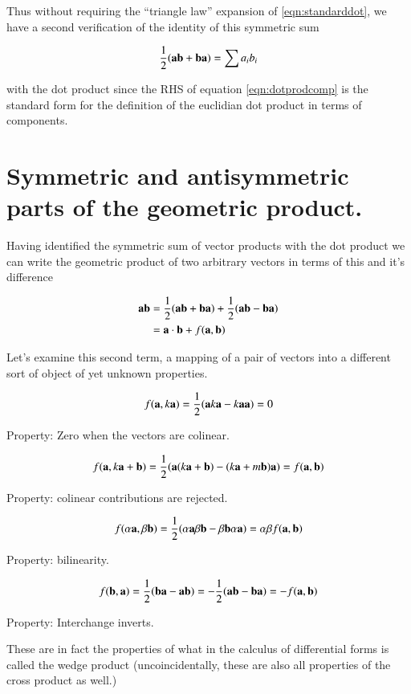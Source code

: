 \documentclass{article}      %
\begin{document}
Thus without requiring the ``triangle law'' expansion of \ref{eqn:standarddot}, we have a second
verification of the identity of this symmetric sum

\begin{equation}\label{eqn:dotprodcomp}
\frac{1}{2}(\mathbf{a}\mathbf{b} + \mathbf{b}\mathbf{a}) = \sum{a_i b_i}
\end{equation}

with the dot product since the RHS of equation \ref{eqn:dotprodcomp} is the standard form for the definition of the euclidian dot product in terms
of components.

\section{ Symmetric and antisymmetric parts of the geometric product. }

Having identified the symmetric sum of vector products with the dot product we can write the geometric product of two arbitrary vectors
in terms of this and it's difference

\begin{align*}
\mathbf{a} \mathbf{b} 
&= \frac{1}{2}(\mathbf{a} \mathbf{b} + \mathbf{b} \mathbf{a}) + \frac{1}{2}(\mathbf{a} \mathbf{b} - \mathbf{b} \mathbf{a}) \\
&= \mathbf{a} \cdot \mathbf{b} + f(\mathbf{a}, \mathbf{b}) \\
\end{align*}

Let's examine this second term, a mapping of a pair of vectors into a different sort of object of yet unknown properties.

\[
f(\mathbf{a}, k\mathbf{a}) = \frac{1}{2}(\mathbf{a} k\mathbf{a} - k\mathbf{a} \mathbf{a}) = 0
\]

Property: Zero when the vectors are colinear.

\[
f(\mathbf{a}, k\mathbf{a} + \mathbf{b}) = \frac{1}{2}(\mathbf{a} (k\mathbf{a} + \mathbf{b}) - (k\mathbf{a} + m\mathbf{b})\mathbf{a}) = f(\mathbf{a}, \mathbf{b})
\]

Property: colinear contributions are rejected.

\[
f(\alpha \mathbf{a}, \beta \mathbf{b}) = \frac{1}{2}(\alpha \mathbf{a} \beta \mathbf{b} - \beta \mathbf{b} \alpha \mathbf{a}) = \alpha \beta f(\mathbf{a}, \mathbf{b})
\]

Property: bilinearity.

\[
f(\mathbf{b}, \mathbf{a}) 
= \frac{1}{2}(\mathbf{b} \mathbf{a} - \mathbf{a}\mathbf{b}) 
= -\frac{1}{2}(\mathbf{a} \mathbf{b} - \mathbf{b}\mathbf{a}) 
= -f(\mathbf{a}, \mathbf{b}) 
\]

Property: Interchange inverts.

These are in fact the properties of what in the calculus of differential forms is called the wedge product (uncoincidentally, these are also all properties of the cross product as well.)
\end{document}

